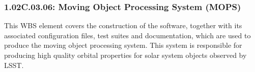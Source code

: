 \subsubsection{1.02C.03.06: Moving Object Processing System (MOPS)}

This WBS element covers the construction of the software, together with
its associated configuration files, test suites and documentation, which
are used to produce the moving object processing system.  This system is
responsible for producing high quality orbital properties for solar
system objects observed by LSST.
